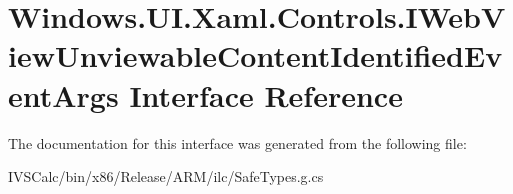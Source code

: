 \hypertarget{interface_windows_1_1_u_i_1_1_xaml_1_1_controls_1_1_i_web_view_unviewable_content_identified_event_args}{}\section{Windows.\+U\+I.\+Xaml.\+Controls.\+I\+Web\+View\+Unviewable\+Content\+Identified\+Event\+Args Interface Reference}
\label{interface_windows_1_1_u_i_1_1_xaml_1_1_controls_1_1_i_web_view_unviewable_content_identified_event_args}


The documentation for this interface was generated from the following file\+:\begin{DoxyCompactItemize}
\item 
I\+V\+S\+Calc/bin/x86/\+Release/\+A\+R\+M/ilc/Safe\+Types.\+g.\+cs\end{DoxyCompactItemize}
